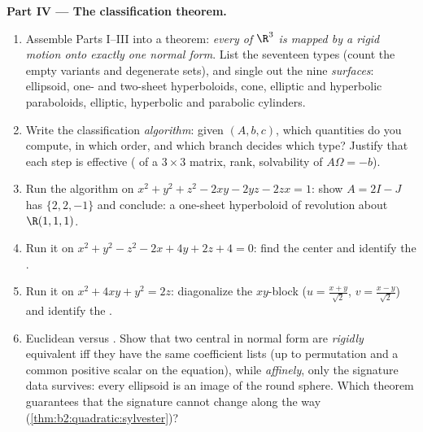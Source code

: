 \begin{problem}
\medskip
\noindent\textbf{Part IV --- The classification theorem.}
\begin{enumerate}[resume]
  \item Assemble Parts I--III into a theorem: \emph{every
         of $\R^3$ is mapped by a rigid motion onto
        exactly one normal form}. List the seventeen 
        types (count the empty variants and degenerate sets),
        and single out the nine  \emph{surfaces}:
        ellipsoid, one- and two-sheet hyperboloids, cone,
        elliptic and hyperbolic paraboloids, elliptic,
        hyperbolic and parabolic cylinders.
  \item Write the classification \emph{algorithm}: given $(A,
        b, c)$, which quantities do you compute, in which
        order, and which branch decides which type? Justify
        that each step is effective ( of a
         $3\times3$ matrix, rank, solvability of
        $A\Omega = -b$).
  \item Run the algorithm on $x^2 + y^2 + z^2 - 2xy - 2yz -
        2zx = 1$: show $A = 2I - J$ has  $\{2, 2,
        -1\}$ and conclude: a one-sheet hyperboloid of
        revolution about $\R(1,1,1)$.
  \item Run it on $x^2 + y^2 - z^2 - 2x + 4y + 2z + 4 = 0$:
        find the center and identify the .
  \item Run it on $x^2 + 4xy + y^2 = 2z$: diagonalize the
        $xy$-block ($u = \frac{x+y}{\sqrt2}$, $v =
        \frac{x-y}{\sqrt2}$) and identify the .
  \item Euclidean versus . Show that two central
         in normal form are \emph{rigidly} equivalent
        iff they have the same coefficient lists (up to
        permutation and a common positive scalar on the
        equation), while \emph{affinely}, only the signature
        data survives: every ellipsoid is an  image of
        the round sphere. Which theorem guarantees that the
        signature cannot change along the way
        (\cref{thm:b2:quadratic:sylvester})?
\end{enumerate}


\end{problem}
